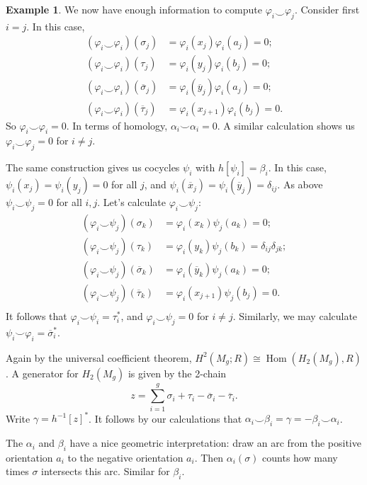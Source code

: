 \documentclass{book}
\renewcommand{\phi}{\varphi}
\DeclareMathOperator{\Hom}{Hom}
\theoremstyle{definition}
\newtheorem{example}[theorem]{Example}
\theoremstyle{remark}
\numberwithin{equation}{section}
\begin{document}
\begin{example}
    We now have enough information to compute $\phi_i \smile \phi_j$. Consider first $i = j$. In this case, 
    \begin{equation} \begin{aligned}
        (\phi_i \smile \phi_i)(\sigma_j) &= \phi_i(x_j) \phi_i(a_j) = 0; \\
        (\phi_i \smile \phi_i)(\tau_j)   &= \phi_i(y_j) \phi_i(b_j) = 0; \\
        (\phi_i \smile \phi_i)(\overline{\sigma}_j) &= \phi_i(\overline{y}_j) \phi_i(a_j) = 0; \\
        (\phi_i \smile \phi_i)(\overline{\tau}_j) &= \phi_i(x_{j+1}) \phi_i(b_j) = 0.
    \end{aligned} \end{equation}
    So $\phi_i \smile \phi_i = 0$. In terms of homology, $\alpha_i \smile \alpha_i = 0$. A similar calculation shows us $\phi_i \smile \phi_j = 0$ for $i \neq j$.

    The same construction gives us cocycles $\psi_i$ with $h[\psi_i] = \beta_i$. In this case, $\psi_i(x_j) = \psi_i(y_j) = 0$ for all $j$, and $\psi_i(\overline{x}_j) = \psi_i(\overline{y}_j) = \delta_{ij}$. As above $\psi_i \smile \psi_j = 0$ for all $i,j$. Let's calculate $\phi_i \smile \psi_j$:
    \begin{equation} \begin{aligned}
        (\phi_i \smile \psi_j)(\sigma_k) &= \phi_i(x_k) \psi_j(a_k) = 0; \\
        (\phi_i \smile \psi_j)(\tau_k) &= \phi_i(y_k) \psi_j(b_k) = \delta_{ij} \delta_{jk}; \\
        (\phi_i \smile \psi_j)(\overline{\sigma}_k) &= \phi_i(\overline{y}_k) \psi_j(a_k) = 0; \\
        (\phi_i \smile \psi_j)(\overline{\tau}_k) &= \phi_i(x_{j+1}) \psi_j(b_j) = 0. \\
    \end{aligned} \end{equation}
    It follows that $\phi_i \smile \psi_i = \tau_i^*$, and $\phi_i \smile \psi_j = 0$ for $i \neq j$. Similarly, we may calculate $\psi_i \smile \phi_i = \overline{\sigma}_i^*$.

    Again by the universal coefficient theorem, $H^2(M_g;R) \cong \Hom(H_2(M_g),R)$. A generator for $H_2(M_g)$ is given by the 2-chain 
    \begin{equation}
        z = \sum_{i=1}^g \sigma_i + \tau_i - \overline{\sigma}_i - \overline{\tau}_i.
    \end{equation}
    Write $\gamma = h^{-1}[z]^*$. It follows by our calculations that $\alpha_i \smile \beta_i = \gamma = -\beta_i \smile \alpha_i$.

    The $\alpha_i$ and $\beta_i$ have a nice geometric interpretation: draw an arc from the positive orientation $a_i$ to the negative orientation $a_i$. Then $\alpha_i(\sigma)$ counts how many times $\sigma$ intersects this arc. Similar for $\beta_i$.
\end{example}
\end{document}

